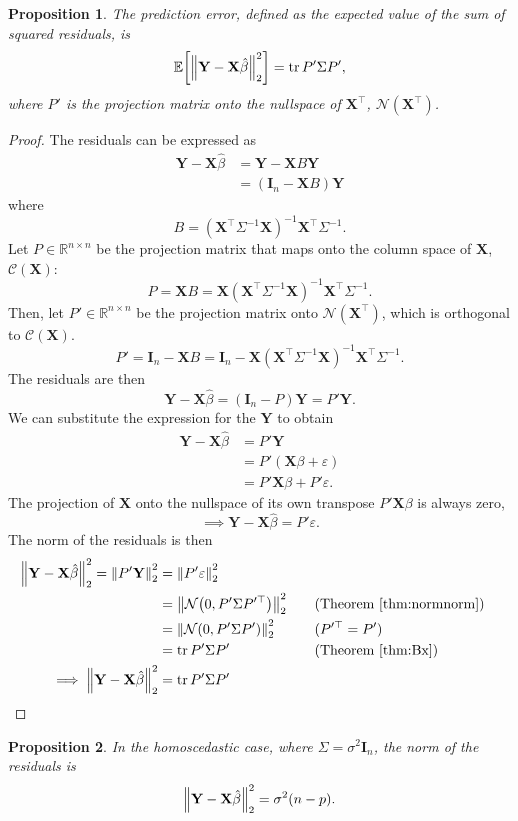 \documentclass[letterpaper, reqno]{amsart}
\newtheorem{prop}{Proposition}[section]
\numberwithin{equation}{section}
\DeclarePairedDelimiter{\norm}{\lVert}{\rVert}
\newcommand{\T}{\top} %
\newcommand{\vect}[1]{\boldsymbol{\mathbf{#1}}} %
\newcommand{\E}[1]{\mathbb{E}\mleft[#1\mright]}
\newcommand{\R}{\mathbb{R}}  %
\newcommand{\N}[2]{\mathcal{N}\mleft( #1, #2 \mright)}
\newcommand{\by}[1]{&\quad&\text{(#1)}}
\newcommand{\Xm}{\vect{X}}
\newcommand{\Yv}{\vect{Y}}
\newcommand{\Bv}{\beta}
\newcommand{\Bvh}{\hat{\beta}}
\newcommand{\ve}{\varepsilon}
\DeclareMathOperator{\tr}{tr}
\begin{document}
\begin{prop}
  The prediction error, defined as the expected value of the sum of squared
  residuals, is
  \[ \E{\norm*{\Yv - \Xm\Bvh}_2^2} = \tr P' \Sigma P', \]
  where $P'$ is the projection matrix onto the nullspace of $\Xm^\T$,
  $\mathscr{N}(\Xm^\T)$.
\end{prop}

\begin{proof}
  The residuals can be expressed as
  \begin{align*}
    \Yv - \Xm\Bvh &= \Yv - \Xm B \Yv \\
    &= (\vect{I}_n - \Xm B) \Yv
  \end{align*}
  where
  \[ B = (\Xm^\T \Sigma^{-1} \Xm)^{-1} \Xm^\T \Sigma^{-1}. \]
  Let $P \in \R^{n \times n}$ be the projection matrix that maps onto the column
  space of $\Xm$, $\mathscr{C}(\Xm)$:
  \[ P = \Xm B =  \Xm (\Xm^\T \Sigma^{-1} \Xm)^{-1} \Xm^\T \Sigma^{-1}. \]
  Then, let $P' \in \R^{n \times n}$ be the projection matrix onto
  $\mathscr{N}(\Xm^\T)$, which is orthogonal to $\mathscr{C}(\Xm)$.
  \[ P' = \vect{I}_n - \Xm B 
        = \vect{I}_n - \Xm (\Xm^\T \Sigma^{-1} \Xm)^{-1} \Xm^\T \Sigma^{-1}. \]
  The residuals are then
  \[ \Yv - \Xm\Bvh = (\vect{I}_n - P)\Yv = P'\Yv. \]
  We can substitute the expression for the $\Yv$ to obtain
  \begin{align*}
    \Yv - \Xm\Bvh &= P' \Yv \\
    &= P' (\Xm\Bv + \ve) \\
    &= P'\Xm\Bv + P'\ve.
  \end{align*}
  The projection of $\Xm$ onto the nullspace of its own transpose $P'\Xm\Bv$ is
  always zero,
  \[ \implies \Yv - \Xm\Bvh = P'\ve. \]
  The norm of the residuals is then
  \begin{alignat*}{3}
    \norm*{\Yv - \Xm\Bvh}_2^2 = \norm*{P'\Yv}_2^2 &= \norm*{P'\ve}_2^2 \\
    &= \norm*{\N{0}{P'\Sigma P'^\T}}_2^2 \by{Theorem~\ref{thm:normnorm}} \\
    &= \norm*{\N{0}{P'\Sigma P'}}_2^2 \by{$P'^\T = P'$} \\
    &= \tr P'\Sigma P' \by{Theorem~\ref{thm:Bx}} \\
    \implies \norm*{\Yv - \Xm\Bvh}_2^2 &= \tr P'\Sigma P' \tag*{\qedhere}
  \end{alignat*}
\end{proof}

\begin{prop}
  In the homoscedastic case, where $\Sigma = \sigma^2 \vect{I}_n$, the norm of
  the residuals is  
  \[ \norm*{\Yv - \Xm\Bvh}_2^2 = \sigma^2 (n - p). \]
\end{prop}
\end{document}
